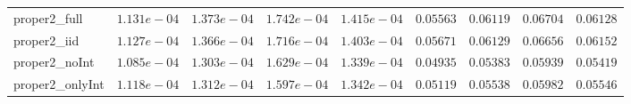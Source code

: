 \begin{table}
\begin{tabular}{lcccccccc}
proper2_full  & $1.131e-04$ & $1.373e-04$ & $1.742e-04$ & $1.415e-04$ & $0.05563$ & $0.06119$ & $0.06704$ & $0.06128$ \\
proper2_iid  & $1.127e-04$ & $1.366e-04$ & $1.716e-04$ & $1.403e-04$ & $0.05671$ & $0.06129$ & $0.06656$ & $0.06152$ \\
proper2_noInt  & $1.085e-04$ & $1.303e-04$ & $1.629e-04$ & $1.339e-04$ & $0.04935$ & $0.05383$ & $0.05939$ & $0.05419$ \\
proper2_onlyInt  & $1.118e-04$ & $1.312e-04$ & $1.597e-04$ & $1.342e-04$ & $0.05119$ & $0.05538$ & $0.05982$ & $0.05546$ \\
\hline 
\end{tabular}


\end{table}